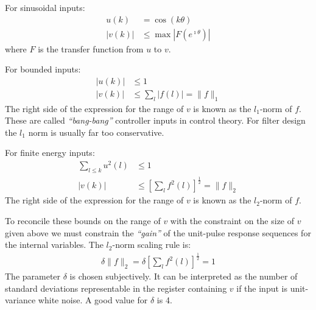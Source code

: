 \documentclass[a4paper,twoside,10pt,english]{report}
\begin{document}
For sinusoidal inputs:
\begin{align*}
u\left(k\right) &= \cos\left(k\theta\right)\\
\left|v\left(k\right)\right| &\le \max\left|F\left(e^{\imath\theta}\right)\right|
\end{align*}
where $F$ is the transfer function from $u$ to $v$.

For bounded inputs:
\begin{align*}
\left|u\left(k\right)\right| &\le 1\\
\left|v\left(k\right)\right| &\le 
\sum_{l}\left|f\left(l\right)\right|=\|f\|_{1}
\end{align*}
The right side of the expression for the range of $v$ is known as the 
$l_{1}$-norm of $f$. These are called \emph{``bang{}-bang''} controller inputs
in control theory. For filter design the ${l_{1}}$ norm is usually far too 
conservative.

For finite energy inputs:
\begin{align*}
\sum_{l \le k}u^{2}\left(l\right) &\le 1 \\
\left|v\left(k\right)\right| &\le 
\left[\sum_{l}f^{2}\left(l\right)\right]^{\frac{1}{2}} = \|f\| _{2}
\end{align*}
The right side of the expression for the range of $v$ is known as the 
$l_{2}$-norm of $f$.

To reconcile these bounds on the range of $v$ with the constraint on the size 
of $v$ given above we must constrain the \emph{``gain''} of the unit-pulse 
response sequences for the internal variables. The $l_{2}$-norm scaling rule is:
\begin{align*}
\delta\|f\|_{2}=\delta\left[\sum_{l}f^{2}\left(l\right)\right]^{\frac{1}{2}}=1
\end{align*}
The parameter $\delta$ is 
chosen subjectively. It can be interpreted as the number of standard deviations
representable in the register containing $v$ if the input is unit-variance
white noise. A good value for $\delta$ is 4.
\end{document}
